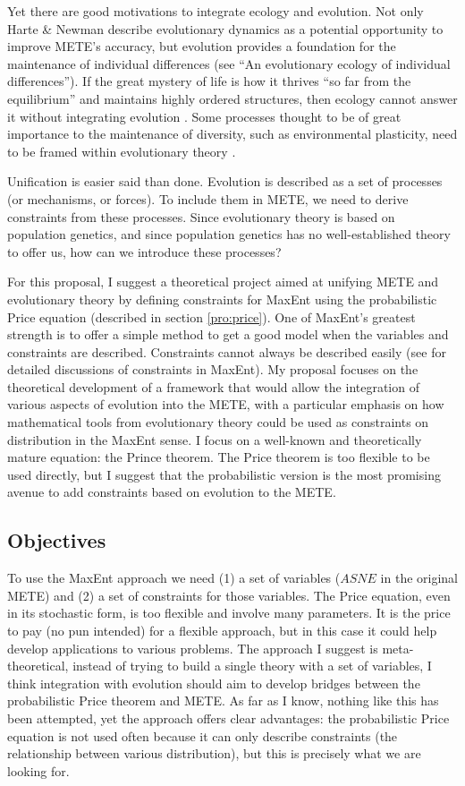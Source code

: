 \documentclass[letterpaper,12pt]{article}
\begin{document}
Yet there are good motivations to integrate ecology and evolution. Not only
Harte \& Newman describe evolutionary dynamics as a potential opportunity to
improve METE's accuracy, but evolution provides a foundation for the
maintenance of individual differences (see ``An evolutionary ecology of
individual differences''\cite{dal12}). If the great mystery of life is how
it thrives ``so far from the equilibrium'' and maintains highly ordered
structures, then ecology cannot answer it without integrating evolution \cite
{gol11}. Some processes thought to be of great importance to the maintenance
of diversity, such as environmental plasticity, need to be framed within
evolutionary theory \cite {wes89,wes03,rof97}.

Unification is easier said than done. Evolution is described as a set of
processes (or mechanisms, or forces). To include them in METE, we need to
derive constraints from these processes. Since evolutionary theory is based
on population genetics, and since population genetics has no well-established theory to
offer us, how can we introduce these processes?

For this proposal, I suggest a theoretical project aimed at unifying METE
and evolutionary theory by defining constraints for MaxEnt using the
probabilistic Price equation (described in section \ref{pro:price}). One of
MaxEnt's greatest strength is to offer a simple method to get a good model
when the variables and constraints are described. Constraints cannot always
be described easily (see \cite{uff95,uff96} for detailed discussions of
constraints in MaxEnt). My proposal focuses on the theoretical development
of a framework that would allow the integration of various aspects of
evolution into the METE, with a particular emphasis on how mathematical
tools from evolutionary theory could be used as constraints on distribution
in the MaxEnt sense. I focus on a well-known and theoretically mature
equation: the Prince theorem. The Price theorem is too flexible to be used
directly, but I suggest that the probabilistic version is the most promising
avenue to add constraints based on evolution to the METE.

\subsection{Objectives}

To use the MaxEnt approach we need (1) a set of variables ($ASNE$ in the
original METE) and (2) a set of constraints for those variables. The Price
equation, even in its stochastic form, is too flexible and involve many
parameters. It is the price to pay (no pun intended) for a flexible
approach, but in this case it could help develop applications to various
problems. The approach I suggest is meta-theoretical, instead of trying to
build a single theory with a set of variables, I think integration with
evolution should aim to develop bridges between the probabilistic Price
theorem and METE. As far as I know, nothing like this has been attempted,
yet the approach offers clear advantages: the probabilistic Price equation
is not used often because it can only describe constraints (the relationship
between various distribution), but this is precisely what we are looking for.
\end{document}
